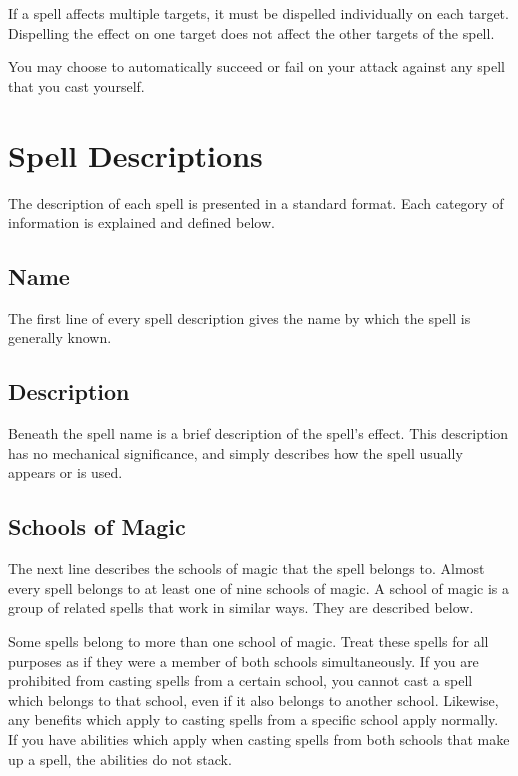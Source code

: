             If a spell affects multiple targets, it must be dispelled individually on each target.
            Dispelling the effect on one target does not affect the other targets of the spell.

            You may choose to automatically succeed or fail on your attack against any spell that you cast yourself.

\section{Spell Descriptions}
    The description of each spell is presented in a standard format.
    Each category of information is explained and defined below.

    \subsection{Name}
        The first line of every spell description gives the name by which the spell is generally known.

    \subsection{Description}
        Beneath the spell name is a brief description of the spell's effect.
        This description has no mechanical significance, and simply describes how the spell usually appears or is used.

    \subsection{Schools of Magic}\label{Schools of Magic}
        The next line describes the schools of magic that the spell belongs to.
        Almost every spell belongs to at least one of nine schools of magic.
        A school of magic is a group of related spells that work in similar ways.
        They are described below.

        Some spells belong to more than one school of magic.
        Treat these spells for all purposes as if they were a member of both schools simultaneously.
        If you are prohibited from casting spells from a certain school, you cannot cast a spell which belongs to that school, even if it also belongs to another school.
        Likewise, any benefits which apply to casting spells from a specific school apply normally.
        If you have abilities which apply when casting spells from both schools that make up a spell, the abilities do not stack.

